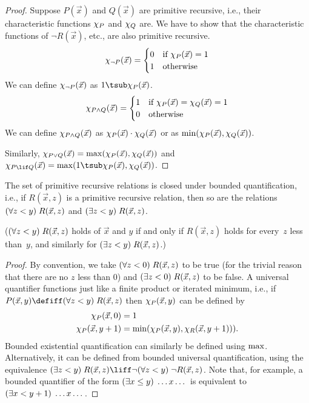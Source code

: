 \documentclass[../../../include/open-logic-section]{subfiles}
\begin{document}
\begin{proof}
  Suppose $P(\vec x)$ and $Q(\vec x)$ are primitive recursive, i.e.,
  their characteristic functions $\chi_{P}$ and $\chi_{Q}$ are.  We
  have to show that the characteristic functions of $\lnot R(\vec x)$,
  etc., are also primitive recursive.
  \[
  \Char{\lnot P}(\vec x) = \begin{cases}
    0 & \text{if $\Char{P}(\vec x) = 1$}\\
    1 & \text{otherwise}
  \end{cases}
  \]
  We can define $\chi_{\lnot P}(\vec x)$ as $1 \tsub \Char{P}(\vec x)$.
  \[
  \Char{P \land Q}(\vec x) = \begin{cases}
    1 & \text{if $\Char{P}(\vec x) = \Char{Q}(\vec x) = 1$}\\
    0 & \text{otherwise}
  \end{cases}
  \]
  We can define $\chi_{P \land Q}(\vec x)$ as $\chi_{P}(\vec x) \cdot
  \chi_{Q}(\vec x)$ or as $\mathrm{min}(\chi_{P}(\vec x), \chi_{Q}(\vec x))$.

  Similarly, $\chi_{P \lor Q}(\vec x) = \mathrm{max}(\chi_{P}(\vec x),
  \chi_{Q}(\vec x))$ and $\Char{P \lif Q}(\vec x) = \fn{max}(1 \tsub
  \Char{P}(\vec x), \Char{Q}(\vec x))$.
\end{proof}

\begin{prop}
  The set of primitive recursive relations is closed under bounded
  quantification, i.e., if $R(\vec x, z)$ is a primitive recursive
  relation, then so are the relations $(\forall z < y)\; R(\vec x, z)$
  and $(\exists z < y)\; R(\vec x, z)$.

  ($(\forall z < y)\; R(\vec x, z)$ holds of $\vec x$ and $y$ if and
  only if $R(\vec x, z)$ holds for every~$z$ less than~$y$, and
  similarly for $(\exists z < y)\; R(\vec x, z)$.)
\end{prop}

\begin{proof}
  By convention, we take $(\forall z < 0)\; R(\vec x, z)$ to be true
  (for the trivial reason that there are no $z$ less than $0$) and
  $(\exists z < 0)\; R(\vec x, z)$ to be false. A universal quantifier
  functions just like a finite product or iterated minimum, i.e., if
  $P(\vec x, y) \defiff \bforall{z < y}{R(\vec x, z)}$ then
  $\chi_{P}(\vec x, y)$ can be defined by
  \begin{align*}
    \Char{P}(\vec x, 0) & = 1\\
    \Char{P}(\vec x, y+1) & =
    \fn{min}(\Char{P}(\vec x, y), \Char{R}(\vec x, y+1))).
  \end{align*}
  Bounded existential quantification can similarly be defined using
  $\mathrm{max}$. Alternatively, it can be defined from bounded universal
  quantification, using the equivalence $\bexists{z < y}{R(\vec x, z)} \liff
  \lnot \bforall{z < y}{\lnot R(\vec x, z)}$. Note that, for example, a
  bounded quantifier of the form $(\exists x \leq y)\; \dots x\dots$ is
  equivalent to $(\exists x < y+1)\; \dots x \dots$.
\end{proof}
  
\end{document}
